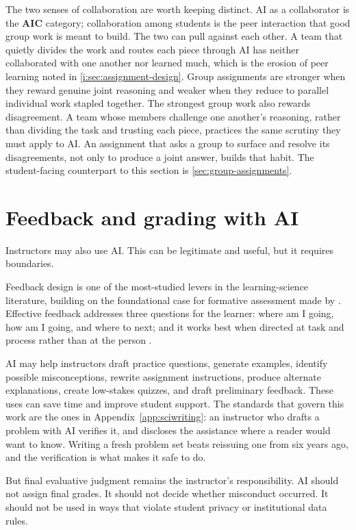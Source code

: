 \documentclass{SIAMbook2023}
\newcommand{\AIC}{\textcolor{catAIC}{\textbf{AIC}}}
\begin{document}
The two senses of collaboration are worth keeping distinct. AI as a collaborator is the \AIC{} category; collaboration among students is the peer interaction that good group work is meant to build. The two can pull against each other. A team that quietly divides the work and routes each piece through AI has neither collaborated with one another nor learned much, which is the erosion of peer learning noted in \cref{i:sec:assignment-design}. Group assignments are stronger when they reward genuine joint reasoning and weaker when they reduce to parallel individual work stapled together. The strongest group work also rewards disagreement. A team whose members challenge one another's reasoning, rather than dividing the task and trusting each piece, practices the same scrutiny they must apply to AI. An assignment that asks a group to surface and resolve its disagreements, not only to produce a joint answer, builds that habit. The student-facing counterpart to this section is \cref{sec:group-assignments}.

\section{Feedback and grading with AI}
\label{i:sec:instructor-ai-use}%

Instructors may also use AI. This can be legitimate and useful, but it requires boundaries.

Feedback design is one of the most-studied levers in the learning-science literature, building on the foundational case for formative assessment made by \citet{black1998assessment}. Effective feedback addresses three questions for the learner: where am I going, how am I going, and where to next; and it works best when directed at task and process rather than at the person \citep{hattie2007power}.

AI may help instructors draft practice questions, generate examples, identify possible misconceptions, rewrite assignment instructions, produce alternate explanations, create low-stakes quizzes, and draft preliminary feedback. These uses can save time and improve student support. The standards that govern this work are the ones in Appendix~\ref{app:sciwriting}: an instructor who drafts a problem with AI verifies it, and discloses the assistance where a reader would want to know. Writing a fresh problem set beats reissuing one from six years ago, and the verification is what makes it safe to do.

But final evaluative judgment remains the instructor's responsibility. AI should not assign final grades. It should not decide whether misconduct occurred. It should not be used in ways that violate student privacy or institutional data rules.
\end{document}
